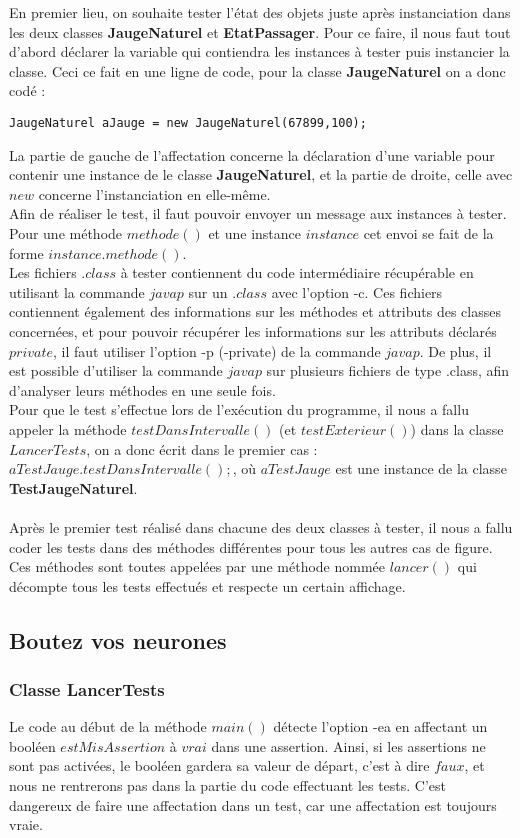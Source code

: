 \documentclass[a4paper,11pts]{article}
\begin{document}
En premier lieu, on souhaite tester l'état des objets juste après instanciation dans les deux classes \textbf{JaugeNaturel} et \textbf{EtatPassager}. Pour ce faire, il nous faut tout d'abord déclarer la variable qui contiendra les instances à tester puis instancier la classe. Ceci ce fait en une ligne de code, pour la classe \textbf{JaugeNaturel} on a donc codé :
\begin{verbatim}
JaugeNaturel aJauge = new JaugeNaturel(67899,100);
\end{verbatim}
La partie de gauche de l'affectation concerne la déclaration d'une variable pour contenir une instance de le classe \textbf{JaugeNaturel}, et la partie de droite, celle avec $new$ concerne l'instanciation en elle-même.\\
Afin de réaliser le test, il faut pouvoir envoyer un message aux instances à tester. Pour une méthode $methode()$ et une instance $instance$ cet envoi se fait de la forme $instance.methode()$.
\\
Les fichiers $.class$ à tester contiennent du code intermédiaire récupérable en utilisant la commande $javap$ sur un $.class$ avec l'option -c. Ces fichiers contiennent également des informations sur les méthodes et attributs des classes concernées, et pour pouvoir récupérer les informations sur les attributs déclarés $private$, il faut utiliser l'option -p (-private) de la commande $javap$.
De plus, il est possible d'utiliser la commande $javap$ sur plusieurs fichiers de type .class, afin d'analyser leurs méthodes en une seule fois.
\\
Pour que le test s'effectue lors de l'exécution du programme, il nous a fallu appeler la méthode $testDansIntervalle()$ (et $testExterieur()$) dans la classe $LancerTests$, on a donc écrit dans le premier cas : $aTestJauge.testDansIntervalle();$, où $aTestJauge$ est une instance de la classe \textbf{TestJaugeNaturel}.
\\
\\
Après le premier test réalisé dans chacune des deux classes à tester, il nous a fallu coder les tests dans des méthodes différentes pour tous les autres cas de figure. Ces méthodes sont toutes appelées par une méthode nommée $lancer()$ qui décompte tous les tests effectués et respecte un certain affichage.

\subsection{Boutez vos neurones}
\subsubsection{Classe LancerTests}
Le code au début de la méthode $main()$ détecte l'option -ea en affectant un booléen $estMisAssertion$ à $vrai$ dans une assertion. Ainsi, si les assertions ne sont pas activées, le booléen gardera sa valeur de départ, c'est à dire $faux$, et nous ne rentrerons pas dans la partie du code effectuant les tests. C'est dangereux de faire une affectation dans un test, car une affectation est toujours vraie.
\end{document}
